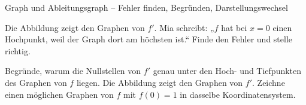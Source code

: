 \begin{aufgabe}{Graph und Ableitungsgraph – Fehler finden, Begründen, Darstellungswechsel}
\begin{teile}
\teil Die Abbildung zeigt den Graphen von $f'$. Mia schreibt: „$f$ hat bei $x = 0$ einen Hochpunkt, weil der Graph dort am höchsten ist.“ Finde den Fehler und stelle richtig.

\begin{ksys}[xmin=-3,xmax=3,ymin=-3,ymax=3,ablesen]  \end{ksys}
\teil Begründe, warum die Nullstellen von $f'$ genau unter den Hoch- und Tiefpunkten des Graphen von $f$ liegen.
\teil Die Abbildung zeigt den Graphen von $f'$. Zeichne einen möglichen Graphen von $f$ mit $f(0) = 1$ in dasselbe Koordinatensystem.

\begin{ksys}[xmin=-2,xmax=4,ymin=-3,ymax=4]  \end{ksys}
\end{teile}
\end{aufgabe}
